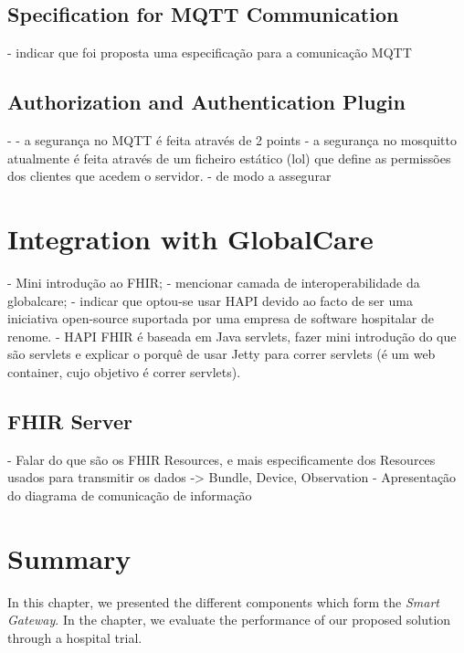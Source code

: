\subsection{Specification for \acs{MQTT} Communication}
- indicar que foi proposta uma especificação para a comunicação MQTT

\subsection{Authorization and Authentication Plugin}
- 
- a segurança no MQTT é feita através de 2 points
- a segurança no mosquitto atualmente é feita através de um ficheiro estático (lol) que define as permissões dos clientes que acedem o servidor.
- de modo a assegurar 

\section{Integration with GlobalCare}

- Mini introdução ao FHIR;
- mencionar camada de interoperabilidade da globalcare;
- indicar que optou-se usar HAPI devido ao facto de ser uma iniciativa open-source suportada por uma empresa de software hospitalar de renome.
- HAPI FHIR é baseada em Java servlets, fazer mini introdução do que são servlets e explicar o porquê de usar Jetty para correr servlets (é um web container, cujo objetivo é correr servlets). 

\subsection{FHIR Server}

- Falar do que são os FHIR Resources, e mais especificamente dos Resources usados para transmitir os dados -> Bundle, Device, Observation
- Apresentação do diagrama de comunicação de informação

\section{Summary}

In this chapter, we presented the different components which form the \textit{Smart Gateway}. In the chapter, we evaluate the performance of our proposed solution through a hospital trial.
